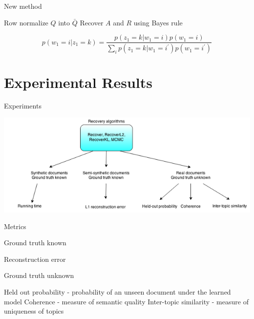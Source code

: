 \documentclass{lecture}
\begin{document}
\begin{plain}{New method}
\begin{itemize}
\p Row normalize $Q$ into $\bar{Q}$
\p Recover $A$ and $R$ using Bayes rule
\end{itemize}
$$p(w_1 = i | z_1 = k) = \frac{p(z_1 = k | w_1 = i)p(w_1 = i)}{\sum_i{p(z_1=k | w_1 = i^\prime)p(w_1=i^\prime)}}$$
\end{plain}

\section[Results]{Experimental Results}
\begin{plain}{Experiments}
\begin{center}
\hspace{-3em}
\includegraphics[scale=0.7]{figs/results_method}
\end{center}
\end{plain}

\begin{plain}{Metrics}
\begin{itemize}
\p Ground truth known
\begin{itemize}
\p Reconstruction error
\end{itemize}
\p Ground truth unknown
\begin{itemize}
\p Held out probability - probability of an unseen document under the learned model
\p Coherence - measure of semantic quality
\p Inter-topic similarity - measure of uniqueness of topics
\end{itemize}
\end{itemize}


\end{plain}

\end{document}

